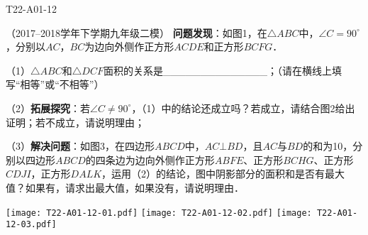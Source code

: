 \begin{defproblem}{T22-A01-12}%
\begin{onlyproblem}%
（2017--2018学年下学期九年级二模）
\textbf{问题发现}：如图1，在$\triangle ABC$中，$\angle  C =90 ^{\circ }$，分别以$AC$，$BC$为边向外侧作正方形$ACDE$和正方形$BCFG$．

（1）$\triangle ABC$和$\triangle DCF$面积的关系是{\_}{\_}{\_}{\_}{\_}{\_}{\_}{\_}{\_}{\_}{\_}{\_}{\_}{\_}；（请在横线上填写``相等''或``不相等''）

（2）\textbf{拓展探究}：若$\angle  C \ne 90^{\circ }$，（1）中的结论还成立吗？若成立，请结合图2给出证明；若不成立，请说明理由；

（3）\textbf{解决问题}：如图3，在四边形$ABCD$中，$AC \bot BD$，且$AC$与$BD$的和为10，分别以四边形$ABCD$的四条边为边向外侧作正方形$ABFE$、正方形$BCHG$、正方形$CDJI$，正方形$DALK$，运用（2）的结论，图中阴影部分的面积和是否有最大值？如果有，请求出最大值，如果没有，请说明理由．


\begin{center}
\texttt{[image: T22-A01-12-01.pdf]}\qquad
\texttt{[image: T22-A01-12-02.pdf]}\qquad
\texttt{[image: T22-A01-12-03.pdf]}
\end{center}



\end{onlyproblem}%
\begin{onlysolution}%
\begin{center}
\end{center}
\end{onlysolution}%
\end{defproblem}



